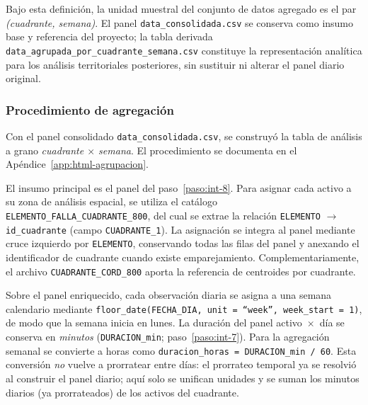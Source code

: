    Bajo esta definición, la unidad muestral del conjunto de datos agregado es el par \textit{(cuadrante, semana)}. El panel \texttt{data\_consolidada.csv} se conserva como insumo base y referencia del proyecto; la tabla derivada \texttt{data\_agrupada\_por\_cuadrante\_semana.csv} constituye la representación analítica para los análisis territoriales posteriores, sin sustituir ni alterar el panel diario original.
    
    \subsubsection{Procedimiento de agregación}
    
    Con el panel consolidado \texttt{data\_consolidada.csv}, se construyó la tabla de análisis a grano \textit{cuadrante $\times$ semana}. El procedimiento se documenta en el Apéndice~\ref{app:html-agrupacion}.
    
    El insumo principal es el panel del paso~\ref{paso:int-8}. Para asignar cada activo a su zona de análisis espacial, se utiliza el catálogo \texttt{ELEMENTO\_FALLA\_CUADRANTE\_800}, del cual se extrae la relación \texttt{ELEMENTO} $\rightarrow$ \texttt{id\_cuadrante} (campo \texttt{CUADRANTE\_1}). La asignación se integra al panel mediante cruce izquierdo por \texttt{ELEMENTO}, conservando todas las filas del panel y anexando el identificador de cuadrante cuando existe emparejamiento. Complementariamente, el archivo \texttt{CUADRANTE\_CORD\_800} aporta la referencia de centroides por cuadrante.
    
    Sobre el panel enriquecido, cada observación diaria se asigna a una semana calendario mediante \texttt{floor\_date(FECHA\_DIA, unit = ``week'', week\_start = 1)}, de modo que la semana inicia en lunes. La duración del panel activo~$\times$~día se conserva en \textit{minutos} (\texttt{DURACION\_min}; paso~\ref{paso:int-7}). Para la agregación semanal se convierte a horas como \texttt{duracion\_horas = DURACION\_min / 60}. Esta conversión \textit{no} vuelve a prorratear entre días: el prorrateo temporal ya se resolvió al construir el panel diario; aquí solo se unifican unidades y se suman los minutos diarios (ya prorrateados) de los activos del cuadrante.
    

